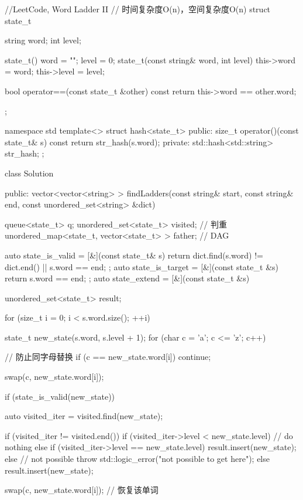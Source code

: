 \begin{Code}
//LeetCode, Word Ladder II
// 时间复杂度O(n)，空间复杂度O(n)
struct state_t {
    string word;
    int level;

    state_t() { word = ""; level = 0; }
    state_t(const string& word, int level) {
        this->word = word;
        this->level = level;
    }

    bool operator==(const state_t &other) const {
        return this->word == other.word;
    }
};

namespace std {
    template<> struct hash<state_t> {
    public:
        size_t operator()(const state_t& s) const {
            return str_hash(s.word);
        }
    private:
        std::hash<std::string> str_hash;
    };
}


class Solution {
public:
    vector<vector<string> > findLadders(const string& start,
        const string& end, const unordered_set<string> &dict) {
        queue<state_t> q;
        unordered_set<state_t> visited; // 判重
        unordered_map<state_t, vector<state_t> > father; // DAG

        auto state_is_valid = [&](const state_t& s) {
            return dict.find(s.word) != dict.end() || s.word == end;
        };
        auto state_is_target = [&](const state_t &s) {return s.word == end; };
        auto state_extend = [&](const state_t &s) {
            unordered_set<state_t> result;

            for (size_t i = 0; i < s.word.size(); ++i) {
                state_t new_state(s.word, s.level + 1);
                for (char c = 'a'; c <= 'z'; c++) {
                    // 防止同字母替换
                    if (c == new_state.word[i]) continue;

                    swap(c, new_state.word[i]);

                    if (state_is_valid(new_state)) {
                        auto visited_iter = visited.find(new_state);

                        if (visited_iter != visited.end()) {
                            if (visited_iter->level < new_state.level) {
                                // do nothing
                            } else if (visited_iter->level == new_state.level) {
                                result.insert(new_state);
                            } else { // not possible
                                throw std::logic_error("not possible to get here");
                            }
                        } else {
                            result.insert(new_state);
                        }
                    }
                    swap(c, new_state.word[i]); // 恢复该单词
                }
            }

}}}
\end{Code}

